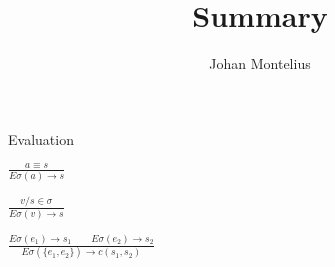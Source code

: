 

\title[ID1019 Summary]{Summary}


\author{Johan Montelius}
\date{\semester}



\begin{frame}
\titlepage
\end{frame}

\begin{frame}{Evaluation}
\pause

{\Huge $\frac{a \equiv s}{E\sigma(a) \rightarrow s}$}
\vspace{20pt} \pause

{\Huge $\frac{v/s \in \sigma}{E\sigma(v) \rightarrow s}$}
\vspace{20pt}\pause

{\Huge $\frac{ E\sigma(e_1) \rightarrow s_1 \qquad   E\sigma(e_2) \rightarrow s_2}{E\sigma(\lbrace e_1 , e_2\rbrace) \rightarrow c(s_1, s_2)}$}

\end{frame}






